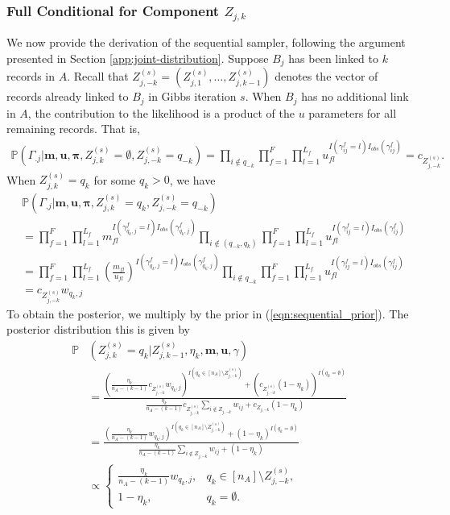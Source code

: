 \documentclass[12pt,letterpaper]{article}
\newcommand{\1}[1]{\mathbb{I}\!\left[#1\right]} %
\begin{document}
\subsubsection{Full Conditional for Component $Z_{j, k}$}  \label{app:sequential-sampler}
We now provide the derivation of the sequential sampler, following the argument presented in Section \ref{app:joint-distribution}. Suppose $B_j$ has been linked to $k$ records in $A$. Recall that $Z_{j, -k}^{(s)} = (Z_{j, 1}^{(s)}, \ldots, Z_{j, k-1}^{(s)})$ denotes the vector of records already linked to $B_j$ in Gibbs iteration $s$. When $B_j$ has no additional link in $A$, the contribution to the likelihood is a product of the $u$ parameters for all remaining records. That is, 
\begin{align*}
	\mathbb{P}(\Gamma_{.j}| \bm{m}, \bm{u}, \bm{\pi}, Z_{j, k}^{(s)} = \emptyset, Z_{j, -k}^{(s)} = q_{-k}) = \prod_{i \notin q_{-k}} \prod_{f=1}^{F}\prod_{l=1}^{L_f} u_{fl}^{I(\gamma_{ij}^f = l)I_{obs}(\gamma_{ij}^f)} = c_{Z_{j, -k}^{(s)}}.
\end{align*}
When $Z_{j, k}^{(s)} = q_k$ for some $q_k > 0$, we have
\begin{align*}
	&\mathbb{P}(\Gamma_{.j}| \bm{m}, \bm{u}, \bm{\pi},  Z_{j, k}^{(s)} = q_k, Z_{j, -k}^{(s)} = q_{-k}) \\ &=\prod_{f=1}^{F}\prod_{l=1}^{L_f} m_{fl}^{I(\gamma_{q_k, j}^f = l)I_{obs}(\gamma_{q_k, j}^f)}  \prod_{i \notin (q_{-k}, q_k)}\prod_{f=1}^{F}\prod_{l=1}^{L_f} u_{fl}^{I(\gamma_{ij}^f = l)I_{obs}(\gamma_{ij}^f)} \\
	&=\prod_{f=1}^{F}\prod_{l=1}^{L_f} \left(\frac{m_{fl}}{u_{fl}} \right)^{I(\gamma_{q_k, j}^f = l)I_{obs}(\gamma_{q_k, j}^f)}  \prod_{i \notin q_{-k}}\prod_{f=1}^{F}\prod_{l=1}^{L_f} u_{fl}^{I(\gamma_{ij}^f = l)I_{obs}(\gamma_{ij}^f)} \\
	&= c_{Z_{j, -k}^{(s)}} w_{q_k, j}
\end{align*}
To obtain the posterior, we multiply by the prior in (\ref{eqn:sequential_prior}). The posterior distribution this is given by
\begin{align*} %
	\mathbb{P}&(Z_{j, k}^{(s)} = q_k|Z_{j, k-1}^{(s)}, \eta_k, \bm{m}, \bm{u}, \gamma) \\
	&= \frac{\left(\frac{\eta_k}{n_A - (k - 1)}c_{Z_{j, -k}^{(s)}} w_{q_k, j}\right)^{I(q_k \in [n_A] \setminus Z_{j, -k}^{(s)})} + \left(c_{Z_{j, -k}^{(s)}}(1 - \eta_k)\right)^{I(q_k = \emptyset)}}{\frac{\eta_k}{n_A - (k - 1)}c_{Z_{j, -k}^{(s)}} \sum_{i \notin Z_{j, -k}} w_{ij} + c_{Z_{j, -k}}(1 - \eta_k)} \\
	&=
	\frac{\left(\frac{\eta_k}{n_A - (k - 1)}w_{q_k, j}\right)^{I(q_k \in [n_A] \setminus Z_{j, -k}^{(s)})} + (1 - \eta_k)^{I(q_k = \emptyset)}}{\frac{\eta_k}{n_A - (k - 1)}\sum_{i \notin Z_{j, -k}} w_{ij} +(1 - \eta_k)} \\
	&\propto \begin{cases}
		\frac{\eta_k}{n_A - (k - 1)} w_{q_k, j}, & q_k \in [n_A] \setminus Z_{j, -k}^{(s)}, \\
		1 - \eta_k, & q_k= \emptyset.
	\end{cases}
\end{align*}
\end{document}
